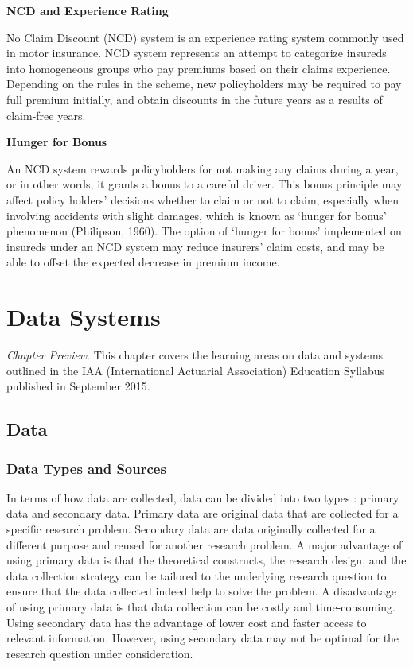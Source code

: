 \documentclass[]{book}
\theoremstyle{definition}
\theoremstyle{definition}
\theoremstyle{definition}
\theoremstyle{remark}
\begin{document}
\textbf{NCD and Experience Rating}

No Claim Discount (NCD) system is an experience rating system commonly
used in motor insurance. NCD system represents an attempt to categorize
insureds into homogeneous groups who pay premiums based on their claims
experience. Depending on the rules in the scheme, new policyholders may
be required to pay full premium initially, and obtain discounts in the
future years as a results of claim-free years.

\textbf{Hunger for Bonus }

An NCD system rewards policyholders for not making any claims during a
year, or in other words, it grants a bonus to a careful driver. This
bonus principle may affect policy holders' decisions whether to claim or
not to claim, especially when involving accidents with slight damages,
which is known as `hunger for bonus' phenomenon (Philipson, 1960). The
option of `hunger for bonus' implemented on insureds under an NCD system
may reduce insurers' claim costs, and may be able to offset the expected
decrease in premium income.

\chapter{Data Systems}\label{C:DataSystems}

\emph{Chapter Preview}. This chapter covers the learning areas on data
and systems outlined in the IAA (International Actuarial Association)
Education Syllabus published in September 2015.

\section{Data}\label{data}

\subsection{Data Types and Sources}\label{data-types-and-sources}

In terms of how data are collected, data can be divided into two types
\citep{hox2005data}: primary data and secondary data. Primary data are
original data that are collected for a specific research problem.
Secondary data are data originally collected for a different purpose and
reused for another research problem. A major advantage of using primary
data is that the theoretical constructs, the research design, and the
data collection strategy can be tailored to the underlying research
question to ensure that the data collected indeed help to solve the
problem. A disadvantage of using primary data is that data collection
can be costly and time-consuming. Using secondary data has the advantage
of lower cost and faster access to relevant information. However, using
secondary data may not be optimal for the research question under
consideration.
\end{document}
